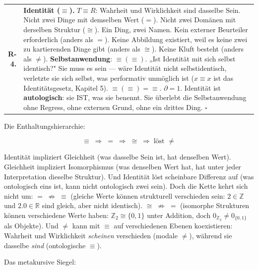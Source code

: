 \documentclass[10pt, openany, oneside]{book}
\begin{document}
{\begin{tabular}{r p{}}
\textbf{R-4.} & \textbf{Identität ($\equiv$).} $T \equiv R$: Wahrheit und Wirklichkeit sind dasselbe Sein. Nicht zwei Dinge mit demselben Wert ($=$). Nicht zwei Domänen mit derselben Struktur ($\cong$). Ein Ding, zwei Namen. Kein externer Beurteiler erforderlich (anders als $=$). Keine Abbildung existiert, weil es keine zwei zu kartierenden Dinge gibt (anders als $\cong$). Keine Kluft besteht (anders als $\neq$). \textbf{Selbstanwendung}: $\equiv(\equiv)$. „Ist Identität mit sich selbst identisch?" Sie muss es sein --- wäre Identität nicht selbstidentisch, verletzte sie sich selbst, was performativ unmöglich ist ($x \equiv x$ ist das Identitätsgesetz, Kapitel 5). $\equiv(\equiv) = \equiv$. $\partial = 1$. Identität ist \textbf{autologisch}: sie IST, was sie benennt. Sie überlebt die Selbstanwendung ohne Regress, ohne externen Grund, ohne ein drittes Ding. $\square$ \\[0.3em]
\end{tabular}
}

\vspace{0.8em}

\noindent Die Enthaltungshierarchie:

$$\equiv \;\Rightarrow\; = \;\Rightarrow\; \cong \;\Rightarrow\; \text{löst } \neq$$

Identität impliziert Gleichheit (was dasselbe Sein ist, hat denselben Wert). Gleichheit impliziert Isomorphismus (was denselben Wert hat, hat unter jeder Interpretation dieselbe Struktur). Und Identität löst scheinbare Differenz auf (was ontologisch eins ist, kann nicht ontologisch zwei sein). Doch die Kette kehrt sich nicht um: $= \;\nRightarrow\; \equiv$ (gleiche Werte können strukturell verschieden sein: $2 \in \mathbb{Z}$ und $2.0 \in \mathbb{R}$ sind gleich, aber nicht identisch). $\cong \;\nRightarrow\; =$ (isomorphe Strukturen können verschiedene Werte haben: $\mathbb{Z}_2 \cong \{0,1\}$ unter Addition, doch $0_{\mathbb{Z}_2} \neq 0_{\{0,1\}}$ als Objekte). Und $\neq$ kann mit $\equiv$ auf verschiedenen Ebenen koexistieren: Wahrheit und Wirklichkeit \textit{scheinen} verschieden (modale $\neq$), während sie dasselbe \textit{sind} (ontologische $\equiv$).

\vspace{0.5em}

Das metakursive Siegel:

\vspace{0.5em}
\end{document}
